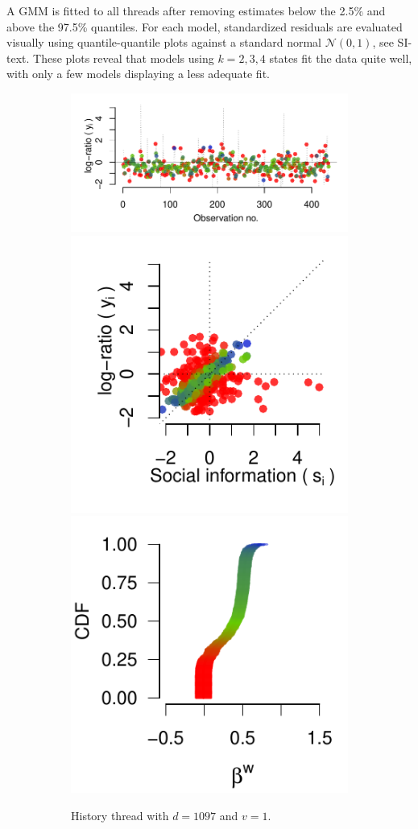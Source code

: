 \documentclass[9pt,a4paper,twocolumn,lineno]{article}
\begin{document}
A GMM is fitted to all threads after removing estimates below the 2.5\% and above the 97.5\% quantiles. For each model, standardized residuals are evaluated visually using quantile-quantile plots against a standard normal $\mathcal{N}(0,1)$, see SI-text. These plots reveal that models using $k=2,3,4$ states fit the data quite well, with only a few models displaying a less adequate fit.

\begin{figure}[!h]
	\centering
	\begin{subfigure}{.44\linewidth}
		\centering
		
		\includegraphics[width=1\linewidth]{threads/thread_history_1097_1.pdf}
		\includegraphics[width=.48\linewidth]{info/info_history_1097_1.pdf}
		\includegraphics[width=.48\linewidth]{betas/beta_history_1097_1.pdf}
		\caption{\footnotesize History thread with $d=1097$ and $v=1$.}
		\label{fig: h=history d=1097, v=1}
	\end{subfigure}
	\begin{subfigure}{.44\linewidth}
		\centering
		

\end{subfigure}
\end{figure}
\end{document}
